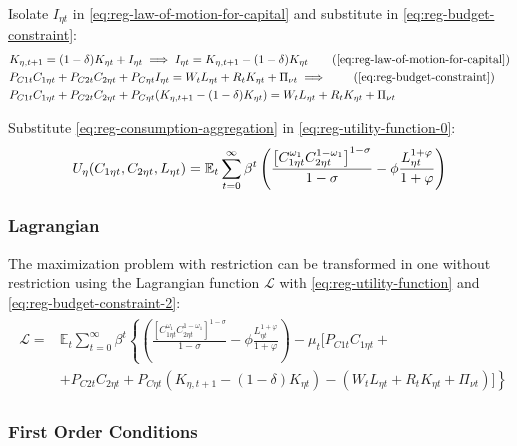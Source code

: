 \documentclass[
thesis.tex
]{subfiles}
\begin{document}
Isolate $I_{\eta t}$ in \ref{eq:reg-law-of-motion-for-capital} and substitute in \ref{eq:reg-budget-constraint}:
\begin{align}
	& K_{\eta, t+1} = (1-\delta)K_{\eta t} + I_{\eta t} \implies I_{\eta t} = K_{\eta, t+1} - (1-\delta)K_{\eta t} \tag{\ref{eq:reg-law-of-motion-for-capital}} \\
	& P_{C1t} C_{1\eta t} + P_{C2t} C_{2\eta t} + P_{C\eta t} I_{\eta t} = W_t L_{\eta t} + R_t K_{\eta t} + \Pi_{\nu t} \implies \tag{\ref{eq:reg-budget-constraint}} \\
	& P_{C1t} C_{1\eta t} + P_{C2t} C_{2\eta t} + P_{C\eta t} (K_{\eta, t+1} - (1-\delta)K_{\eta t}) = W_t L_{\eta t} + R_t K_{\eta t} + \Pi_{\nu t} \label{eq:reg-budget-constraint-2}
\end{align}

Substitute \ref{eq:reg-consumption-aggregation} in \ref{eq:reg-utility-function-0}:
\begin{align}
	U_{\eta}(C_{1\eta t}, C_{2\eta t}, L_{\eta t}) = {\mathbb{E}_{t}} \sum_{t=0}^{\infty} \beta^t \left( \frac{\left[ C_{1\eta t}^{\omega_1} C_{2\eta t}^{1-\omega_1} \right]^{1-\sigma}}{1-\sigma} - \phi \frac{L_{\eta t}^{1+\varphi}}{1+\varphi} \right) \label{eq:reg-utility-function}
\end{align}

\subsubsection*{Lagrangian}

The maximization problem with restriction can be transformed in one without restriction using the Lagrangian function $\mathcal{L}$ with \ref{eq:reg-utility-function} and \ref{eq:reg-budget-constraint-2}:
\begin{align}
	\begin{split}
		\mathcal{L} = &\mathbb{E}_t \sum_{t=0}^{\infty} \beta^t \left\{ \left( \frac{ \left[ C_{1\eta t}^{\omega_1} C_{2\eta t}^{1-\omega_1} \right]^{1-\sigma}}{1-\sigma} - \phi \frac{L_{\eta t}^{1+\varphi}}{1+\varphi} \right) - \mu_t \Big[ P_{C1t} C_{1\eta t} + \right. \\ & \left. + P_{C2t} C_{2\eta t} + P_{C\eta t} (K_{\eta, t+1} - (1-\delta)K_{\eta t}) -(W_t L_{\eta t} + R_t K_{\eta t} + \Pi_{\nu t}) \Big] \right\} \label{eq:reg-household-lagrangian}
	\end{split}
\end{align}


\subsubsection*{First Order Conditions}
\end{document}

